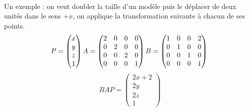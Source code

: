 \documentclass{EPUProjetDi}
\begin{document}
\paragraph{}
Un exemple : on veut doubler la taille d'un modèle puis le déplacer de deux unités dans le sens $+x$, on applique la transformation suivante à chacun de ses points.
$$
	P = \begin{pmatrix}x\\y\\z\\1\end{pmatrix}\\
	A = \begin{pmatrix}2&0&0&0\\0&2&0&0\\0&0&2&0\\0&0&0&1\end{pmatrix}\\
	B = \begin{pmatrix}1&0&0&2\\0&1&0&0\\0&0&1&0\\0&0&0&1\end{pmatrix}\\
$$
$$
	BAP = \begin{pmatrix}2x+2\\2y\\2z\\1\end{pmatrix}
$$
\end{document}

